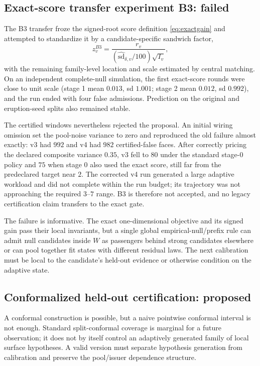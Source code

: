 \documentclass[11pt]{article}
\begin{document}
\subsection*{Exact-score transfer experiment B3: failed}
The B3 transfer froze the signed-root score definition \eqref{eq:exactgain} and attempted to
standardize it by a candidate-specific sandwich factor,
\begin{equation}\label{eq:b3score}
z_v^{B3}=\frac{r_v}{(\widehat{\mathrm{sd}}_{\delta,v}/100)\sqrt{I_v}},
\end{equation}
with the remaining family-level location and scale estimated by central matching. On an independent
complete-null simulation, the first exact-score rounds were close to unit scale (stage 1 mean
$0.013$, sd $1.001$; stage 2 mean $0.012$, sd $0.992$), and the run ended with four false
admissions. Prediction on the original and eruption-seed splits also remained stable.

The certified windows nevertheless rejected the proposal. An initial wiring omission set the
pool-noise variance to zero and reproduced the old failure almost exactly: v3 had $992$ and v4 had
$982$ certified-false faces. After correctly pricing the declared composite variance $0.35$, v3 fell
to $80$ under the standard stage-0 policy and $75$ when stage 0 also used the exact score, still far
from the predeclared target near $2$. The corrected v4 run generated a large adaptive workload and
did not complete within the run budget; its trajectory was not approaching the required $3$--$7$
range. B3 is therefore not accepted, and no legacy certification claim transfers to the exact gate.

The failure is informative. The exact one-dimensional objective and its signed gain pass their local
invariants, but a single global empirical-null/prefix rule can admit null candidates inside $W$ as
passengers behind strong candidates elsewhere or can pool together fit states with different residual
laws. The next calibration must be local to the candidate's held-out evidence or otherwise condition
on the adaptive state.

\subsection*{Conformalized held-out certification: proposed}
A conformal construction is possible, but a naive pointwise conformal interval is not enough. Standard
split-conformal coverage is marginal for a future observation; it does not by itself control an
adaptively generated family of local surface hypotheses. A valid version must separate hypothesis
generation from calibration and preserve the pool/issuer dependence structure.
\end{document}
